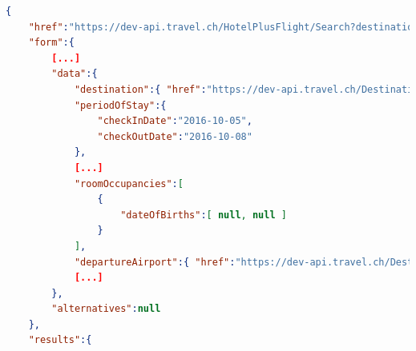 \begin{lstlisting}[language=json,firstnumber=1]
{
    "href":"https://dev-api.travel.ch/HotelPlusFlight/Search?destination=https%3A%2F%2Fdev-api.travel.ch%2FDestination%2F6547539&periodOfStay.checkInDate=2016-10-05&periodOfStay.checkOutDate=2016-10-08&roomOccupancies%5B0%5D.dateOfBirths%5B0%5D=null&roomOccupancies%5B0%5D.dateOfBirths%5B1%5D=null&hotelCategories%5B0%5D=https%3A%2F%2Fdev-api.travel.ch%2FHotelCategory%2FNone&hotelCategories%5B1%5D=https%3A%2F%2Fdev-api.travel.ch%2FHotelCategory%2FOne&hotelCategories%5B2%5D=https%3A%2F%2Fdev-api.travel.ch%2FHotelCategory%2FTwo&hotelCategories%5B3%5D=https%3A%2F%2Fdev-api.travel.ch%2FHotelCategory%2FThree&hotelCategories%5B4%5D=https%3A%2F%2Fdev-api.travel.ch%2FHotelCategory%2FFour&hotelCategories%5B5%5D=https%3A%2F%2Fdev-api.travel.ch%2FHotelCategory%2FFive&departureAirports%5B0%5D=https%3A%2F%2Fdev-api.travel.ch%2FDestination%2FA6299722&luggageOptions%5B0%5D=https%3A%2F%2Fdev-api.travel.ch%2FLuggageOption%2FWithLuggage&luggageOptions%5B1%5D=https%3A%2F%2Fdev-api.travel.ch%2FLuggageOption%2FWithoutLuggage&ratings.minimal=0&ratings.maximal=100&mealTypeCategories%5B0%5D=https%3A%2F%2Fdev-api.travel.ch%2FHotelMealTypeCategory%2FRoomOnly&mealTypeCategories%5B1%5D=https%3A%2F%2Fdev-api.travel.ch%2FHotelMealTypeCategory%2FBreakfast&mealTypeCategories%5B2%5D=https%3A%2F%2Fdev-api.travel.ch%2FHotelMealTypeCategory%2FHalfBoard&mealTypeCategories%5B3%5D=https%3A%2F%2Fdev-api.travel.ch%2FHotelMealTypeCategory%2FFullBoard&mealTypeCategories%5B4%5D=https%3A%2F%2Fdev-api.travel.ch%2FHotelMealTypeCategory%2FAllInclusive&directFlight=False&flightClasses%5B0%5D=https%3A%2F%2Fdev-api.travel.ch%2FFlightClass%2FEconomy&flightClasses%5B1%5D=https%3A%2F%2Fdev-api.travel.ch%2FFlightClass%2FBusiness&matchHotels=True",
    "form":{
        [...]
        "data":{
            "destination":{ "href":"https://dev-api.travel.ch/Destination/6547539" },
            "periodOfStay":{
                "checkInDate":"2016-10-05",
                "checkOutDate":"2016-10-08"
            },
            [...]
            "roomOccupancies":[
                {
                    "dateOfBirths":[ null, null ]
                }
            ],
            "departureAirport":{ "href":"https://dev-api.travel.ch/Destination/A6299722" },
            [...]
        },
        "alternatives":null
    },
    "results":{

\end{lstlisting}
